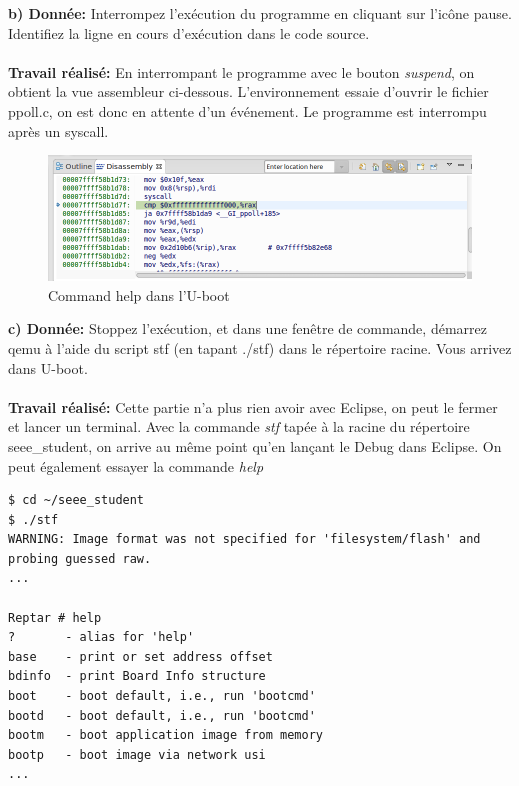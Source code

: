 \textbf{b) Donnée: } Interrompez l'exécution du programme en cliquant sur l'icône pause. Identifiez la ligne en cours d'exécution dans le code source. \\\\
\textbf{Travail réalisé: }En interrompant le programme avec le bouton \textit{suspend}, on obtient la vue assembleur ci-dessous. L'environnement essaie d'ouvrir le fichier ppoll.c, on est donc en attente d'un événement. Le programme est interrompu après un syscall.
\begin{figure}[H]
	\begin{center}
		\includegraphics[width=18cm]{img/ubootAsm.png}
		\caption{Command help dans l'U-boot}
		\label{ubootAsm}
	\end{center}
\end{figure}
\textbf{c) Donnée: } Stoppez l'exécution, et dans une fenêtre de commande, démarrez qemu à l'aide du script stf (en
tapant ./stf) dans le répertoire racine. Vous arrivez dans U-boot. \\\\
\textbf{Travail réalisé: }Cette partie n'a plus rien avoir avec Eclipse, on peut le fermer et lancer un terminal.
Avec la commande \textit{stf} tapée à la racine du répertoire seee\_student, on arrive au même point qu'en lançant le Debug dans Eclipse. On peut également essayer la commande \textit{help}
\begin{lstlisting}
$ cd ~/seee_student
$ ./stf
WARNING: Image format was not specified for 'filesystem/flash' and probing guessed raw.
...

Reptar # help
?       - alias for 'help'
base    - print or set address offset
bdinfo  - print Board Info structure
boot    - boot default, i.e., run 'bootcmd'
bootd   - boot default, i.e., run 'bootcmd'
bootm   - boot application image from memory
bootp   - boot image via network usi
...
\end{lstlisting}
